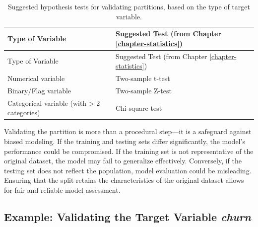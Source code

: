 \documentclass[
  11pt,
]{book}
\theoremstyle{definition}
\theoremstyle{definition}
\theoremstyle{definition}
\theoremstyle{definition}
\theoremstyle{remark}
\begin{document}
\begin{longtable}[]{@{}
  >{\raggedright\arraybackslash}p{}
  >{\raggedright\arraybackslash}p{}@{}}
\caption{\label{tab:partition-test} Suggested hypothesis tests for validating partitions, based on the type of target variable.}\tabularnewline
\toprule\noalign{}
\begin{minipage}[b]{\linewidth}\raggedright
Type of Variable
\end{minipage} & \begin{minipage}[b]{\linewidth}\raggedright
Suggested Test (from Chapter \ref{chapter-statistics})
\end{minipage} \\
\midrule\noalign{}
\endfirsthead
\toprule\noalign{}
\begin{minipage}[b]{\linewidth}\raggedright
Type of Variable
\end{minipage} & \begin{minipage}[b]{\linewidth}\raggedright
Suggested Test (from Chapter \ref{chapter-statistics})
\end{minipage} \\
\midrule\noalign{}
\endhead
\bottomrule\noalign{}
\endlastfoot
Numerical variable & Two-sample t-test \\
Binary/Flag variable & Two-sample Z-test \\
Categorical variable (with \textgreater{} 2 categories) & Chi-square test \\
\end{longtable}

Validating the partition is more than a procedural step---it is a safeguard against biased modeling. If the training and testing sets differ significantly, the model's performance could be compromised. If the training set is not representative of the original dataset, the model may fail to generalize effectively. Conversely, if the testing set does not reflect the population, model evaluation could be misleading. Ensuring that the split retains the characteristics of the original dataset allows for fair and reliable model assessment.

\subsection*{\texorpdfstring{Example: Validating the Target Variable \emph{churn}}{Example: Validating the Target Variable churn}}\label{example-validating-the-target-variable-churn}
\end{document}
